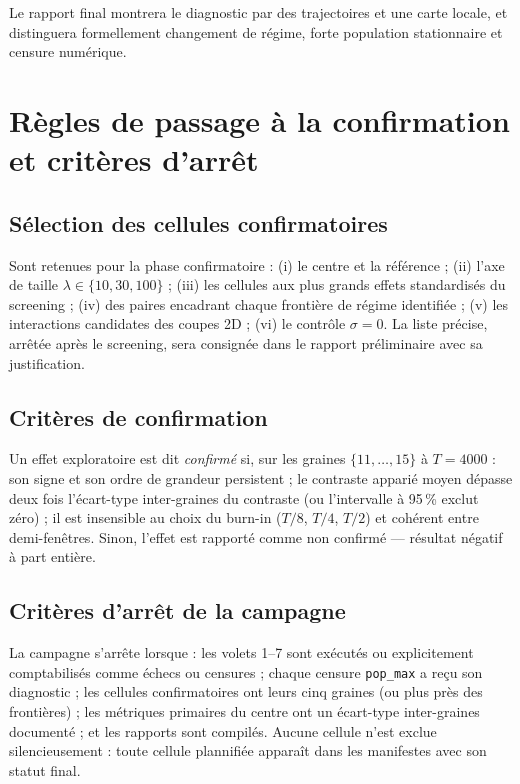 \documentclass[11pt,a4paper]{article}
\newcommand{\code}[1]{\texttt{#1}}
\begin{document}
Le rapport final montrera le diagnostic par des trajectoires et une carte
locale, et distinguera formellement changement de régime, forte population
stationnaire et censure numérique.

\section{Règles de passage à la confirmation et critères d'arrêt}
\label{sec:confirmation}

\subsection{Sélection des cellules confirmatoires}

Sont retenues pour la phase confirmatoire : (i) le centre et la référence ;
(ii) l'axe de taille $\lambda\in\{10,30,100\}$ ; (iii) les cellules aux
plus grands effets standardisés du screening ; (iv) des paires encadrant
chaque frontière de régime identifiée ; (v) les interactions candidates des
coupes 2D ; (vi) le contrôle $\sigma=0$. La liste précise, arrêtée après le
screening, sera consignée dans le rapport préliminaire avec sa
justification.

\subsection{Critères de confirmation}

Un effet exploratoire est dit \emph{confirmé} si, sur les graines
$\{11,\dots,15\}$ à $T=4000$ : son signe et son ordre de grandeur
persistent ; le contraste apparié moyen dépasse deux fois l'écart-type
inter-graines du contraste (ou l'intervalle à 95\,\% exclut zéro) ; il est
insensible au choix du burn-in ($T/8$, $T/4$, $T/2$) et cohérent entre
demi-fenêtres. Sinon, l'effet est rapporté comme non confirmé --- résultat
négatif à part entière.

\subsection{Critères d'arrêt de la campagne}

La campagne s'arrête lorsque : les volets 1--7 sont exécutés ou
explicitement comptabilisés comme échecs ou censures ; chaque censure
\code{pop\_max} a reçu son diagnostic ; les cellules confirmatoires ont
leurs cinq graines (ou plus près des frontières) ; les métriques primaires
du centre ont un écart-type inter-graines documenté ; et les rapports sont
compilés. Aucune cellule n'est exclue silencieusement : toute cellule
plannifiée apparaît dans les manifestes avec son statut final.
\end{document}
